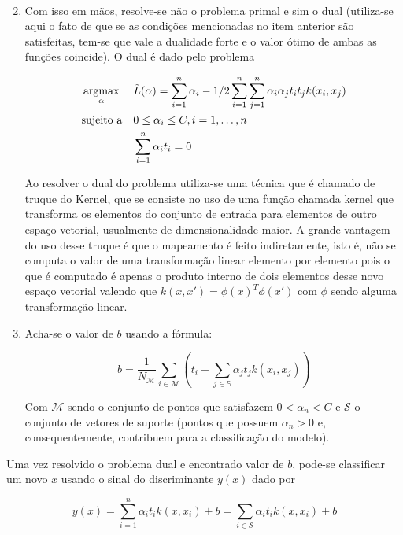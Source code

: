 \begin{enumerate}
\begin{gather}
		\end{gather} 
	\item Com isso em mãos, resolve-se não o problema primal e sim o dual (utiliza-se aqui o fato 
	de que se as condições mencionadas no item anterior são satisfeitas, tem-se que vale
	a dualidade forte e o valor ótimo de ambas as funções coincide). O dual é dado pelo problema
		\begin{center}
			\begin{equation}
				\begin{aligned}	
				& \operatorname*{argmax}_{\alpha}
				& & \tilde{L}(\alpha) = \sum_{i = 1}^n \alpha_i - 1/2 \sum_{i = 1}^n \sum_{j = 1}^n \alpha_i\alpha_j t_i t_j k(x_i, x_j) \\
				& \text{sujeito a}
				& & 0 \le \alpha_i \le C, i = 1, \ldots, n \\
				&&& \sum_{i = 1}^n \alpha_i t_i = 0 
				\end{aligned}
			\end{equation}
		\end{center}
	Ao resolver o dual do problema utiliza-se uma técnica que é chamado de truque do Kernel,
	que se consiste no uso de uma função chamada kernel que transforma os elementos do conjunto
	de entrada para elementos de outro espaço vetorial, usualmente de dimensionalidade maior.
	A grande vantagem do uso desse truque é que o mapeamento é feito indiretamente, isto é, 
	não se computa o valor de uma transformação linear elemento por elemento pois o que é computado
	é apenas o produto interno de dois elementos desse novo espaço vetorial valendo que 
	$k(x, x') = \phi(x)^T\phi(x')$ com $\phi$ sendo alguma transformação linear.
	\item Acha-se o valor de $b$ usando a fórmula:
		\begin{center}
			\begin{equation}
				b = \frac{1}{N_{\mathcal{M}}} \sum_{i \in \mathcal{M}} \left( t_i - \sum_{j \in \mathbb{S}} \alpha_j t_j k(x_i, x_j) \right)
			\end{equation}
		\end{center}
	Com $\mathcal{M}$ sendo o conjunto de pontos que satisfazem $0 < \alpha_n < C$ e 
	$\mathcal{S}$ o conjunto de vetores de suporte (pontos que possuem $\alpha_n > 0$ e,
	consequentemente, contribuem para a classificação do modelo).
\end{enumerate}

Uma vez resolvido o problema dual e encontrado valor de $b$, pode-se classificar um novo
$x$ usando o sinal do discriminante $y(x)$ dado por
\begin{center}
	\begin{equation}
		y(x) = \sum_{i = 1}^n \alpha_i t_i k(x, x_i) + b = \sum_{i \in \mathcal{S}} \alpha_i t_i k(x, x_i) + b
	\end{equation}
\end{center}

